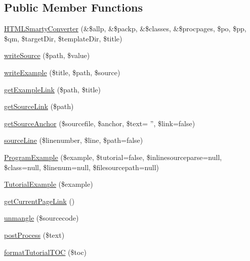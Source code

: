 \subsection*{\-Public \-Member \-Functions}
\begin{DoxyCompactItemize}
\item 
\hyperlink{class_h_t_m_l_smarty_converter_aba04749e9998df97f3f1b4349657ed5f}{\-H\-T\-M\-L\-Smarty\-Converter} (\&\$allp, \&\$packp, \&\$classes, \&\$procpages, \$po, \$pp, \$qm, \$target\-Dir, \$template\-Dir, \$title)
\item 
\hyperlink{class_h_t_m_l_smarty_converter_abd54588ec4cf2a0c5d087031485f932e}{write\-Source} (\$path, \$value)
\item 
\hyperlink{class_h_t_m_l_smarty_converter_a757f70385404e298a4c053d6b7d1be28}{write\-Example} (\$title, \$path, \$source)
\item 
\hyperlink{class_h_t_m_l_smarty_converter_a26b4615e9204cd081dd51fd0367bf4d6}{get\-Example\-Link} (\$path, \$title)
\item 
\hyperlink{class_h_t_m_l_smarty_converter_a606ad911462a36f943313ed5475db5dc}{get\-Source\-Link} (\$path)
\item 
\hyperlink{class_h_t_m_l_smarty_converter_a0cc7c24f111109ea1d8559681ecd6b77}{get\-Source\-Anchor} (\$sourcefile, \$anchor, \$text= '', \$link=false)
\item 
\hyperlink{class_h_t_m_l_smarty_converter_a14f6bc6e9d8bbe09c506108e657b6f87}{source\-Line} (\$linenumber, \$line, \$path=false)
\item 
\hyperlink{class_h_t_m_l_smarty_converter_a50aa5ec756e883826c3c06cf65ce61a5}{\-Program\-Example} (\$example, \$tutorial=false, \$inlinesourceparse=null, \$class=null, \$linenum=null, \$filesourcepath=null)
\item 
\hyperlink{class_h_t_m_l_smarty_converter_aeb023df705aa419245272dd0face61ed}{\-Tutorial\-Example} (\$example)
\item 
\hyperlink{class_h_t_m_l_smarty_converter_a37cda5b82aee3c5062d29b829345ef7e}{get\-Current\-Page\-Link} ()
\item 
\hyperlink{class_h_t_m_l_smarty_converter_ab36840588a8c62493031b9f23c4918c5}{unmangle} (\$sourcecode)
\item 
\hyperlink{class_h_t_m_l_smarty_converter_a0b2058070d303b4d06535be248b021ab}{post\-Process} (\$text)
\item 
\hyperlink{class_h_t_m_l_smarty_converter_a8207fcf7f5bfbbc02a865ef39b03921a}{format\-Tutorial\-T\-O\-C} (\$toc)
\item 

\end{DoxyCompactItemize}
